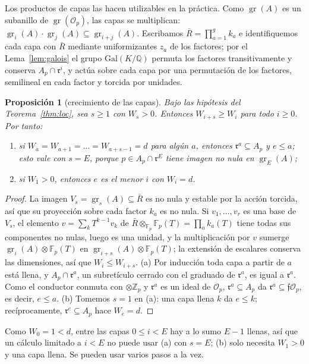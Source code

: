 \documentclass[11pt,a4paper]{article}
\newtheorem{proposition}[theorem]{Proposición}
\theoremstyle{definition}
\newcommand{\ZZ}{\mathbb{Z}}
\newcommand{\QQ}{\mathbb{Q}}
\newcommand{\FF}{\mathbb{F}}
\newcommand{\cO}{\mathcal{O}}
\newcommand{\cf}{\mathfrak{f}}
\newcommand{\rad}{\mathfrak{r}}
\newcommand{\gr}{\operatorname{gr}}
\begin{document}
\noindent Los productos de capas las hacen utilizables en la práctica. Como $\gr(A)$ es un subanillo de
$\gr(\cO_p)$, las capas se multiplican: $\gr_i(A)\cdot\gr_j(A)\subseteq\gr_{i+j}(A)$. Escribamos $\bar R=\prod_{a=1}^{g}k_a$ e
identifiquemos cada capa con $\bar R$ mediante uniformizantes $z_a$ de los factores; por el Lema~\ref{lem:galois} el grupo
$\mathrm{Gal}(K/\QQ)$ permuta los factores transitivamente y conserva $A_p\cap\rad^i$, y actúa sobre cada capa por una
permutación de los factores, semilineal en cada factor y torcida por unidades.

\begin{proposition}[crecimiento de las capas]\label{prop:cert}
Bajo las hipótesis del Teorema~\ref{thm:loc}, sea $s\ge1$ con $W_s>0$. Entonces $W_{i+s}\ge W_i$ para todo $i\ge0$. Por tanto:
\begin{enumerate}
\item[(a)] si $W_a=W_{a+1}=\dots=W_{a+s-1}=d$ para algún $a$, entonces $\rad^a\subseteq A_p$ y $e\le a$; esto vale con
 $s=E$, porque $p\in A_p\cap\rad^E$ tiene imagen no nula en $\gr_E(A)$;
\item[(b)] si $W_1>0$, entonces $e$ es el menor $i$ con $W_i=d$.
\end{enumerate}
\end{proposition}

\begin{proof}
La imagen $V_s=\gr_s(A)\subseteq\bar R$ es no nula y estable por la acción torcida, así que su proyección sobre
cada factor $k_a$ es no nula. Si $v_1,\dots,v_r$ es una base de $V_s$, el elemento $v=\sum_k T^{k-1}v_k$ de
$\bar R\otimes_{\FF_p}\FF_p(T)=\prod_ak_a(T)$ tiene todas sus componentes no nulas, luego es una unidad, y la
multiplicación por $v$ sumerge $\gr_i(A)\otimes\FF_p(T)$ en $\gr_{i+s}(A)\otimes\FF_p(T)$; la extensión de escalares
conserva las dimensiones, así que $W_i\le W_{i+s}$. (a) Por inducción toda capa a partir de $a$ está llena, y
$A_p\cap\rad^a$, un subretículo cerrado con el graduado de $\rad^a$, es igual a $\rad^a$. Como el conductor conmuta
con $\otimes\ZZ_p$ y $\rad^a$ es un ideal de $\cO_p$, $\rad^a\subseteq A_p$ da $\rad^a\subseteq\cf\cO_p$, es decir,
$e\le a$. (b) Tomemos $s=1$ en (a): una capa llena $k$ da $e\le k$; recíprocamente, $\rad^e\subseteq A_p$ hace $W_e=d$.
\end{proof}

\noindent Como $W_0=1<d$, entre las capas $0\le i<E$ hay a lo sumo $E-1$ llenas, así que un cálculo limitado a $i<E$
no puede usar (a) con $s=E$; (b) solo necesita $W_1>0$ y una capa llena. Se pueden usar varios pasos a la vez.
\end{document}
